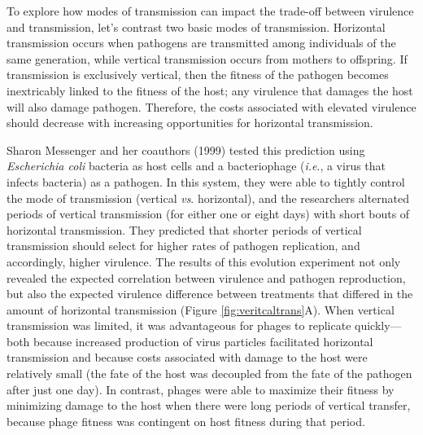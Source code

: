 \documentclass[
]{book}
\begin{document}
To explore how modes of transmission can impact the trade-off between virulence and transmission, let's contrast two basic modes of transmission. Horizontal transmission occurs when pathogens are transmitted among individuals of the same generation, while vertical transmission occurs from mothers to offspring. If transmission is exclusively vertical, then the fitness of the pathogen becomes inextricably linked to the fitness of the host; any virulence that damages the host will also damage pathogen. Therefore, the costs associated with elevated virulence should decrease with increasing opportunities for horizontal transmission.

Sharon Messenger and her coauthors (1999) tested this prediction using \emph{Escherichia coli} bacteria as host cells and a bacteriophage (\emph{i.e}., a virus that infects bacteria) as a pathogen. In this system, they were able to tightly control the mode of transmission (vertical \emph{vs}. horizontal), and the researchers alternated periods of vertical transmission (for either one or eight days) with short bouts of horizontal transmission. They predicted that shorter periods of vertical transmission should select for higher rates of pathogen replication, and accordingly, higher virulence. The results of this evolution experiment not only revealed the expected correlation between virulence and pathogen reproduction, but also the expected virulence difference between treatments that differed in the amount of horizontal transmission (Figure \ref{fig:veritcaltrans}A). When vertical transmission was limited, it was advantageous for phages to replicate quickly---both because increased production of virus particles facilitated horizontal transmission and because costs associated with damage to the host were relatively small (the fate of the host was decoupled from the fate of the pathogen after just one day). In contrast, phages were able to maximize their fitness by minimizing damage to the host when there were long periods of vertical transfer, because phage fitness was contingent on host fitness during that period.
\end{document}
